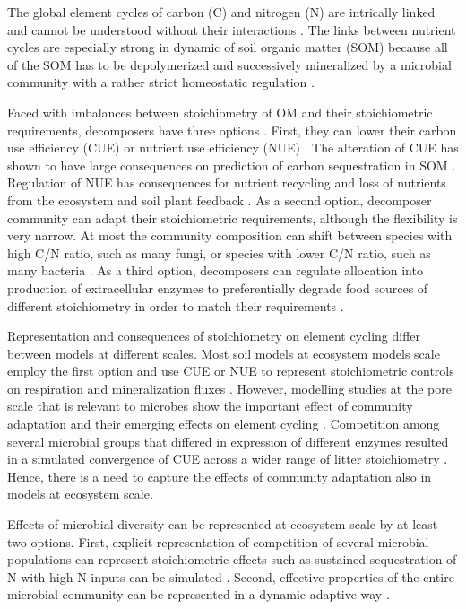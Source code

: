\introduction
The global element cycles of carbon (C) and nitrogen (N) are intrically linked
and cannot be understood without their interactions \citep{Thornton07,
Zaehle11}. The links between nutrient cycles are especially strong in dynamic of
soil organic matter (SOM) because all of the SOM has to be depolymerized and
successively mineralized by a microbial community with a rather strict
homeostatic regulation \citep{Sterner02, Zechmeister15}. 

Faced with imbalances between stoichiometry of OM and their stoichiometric
requirements, decomposers have three options \citep{Mooshammer14}. First,
they can lower their carbon use efficiency (CUE) or nutrient use efficiency
(NUE) \citep{Sinsabaugh13}. The alteration of CUE has shown to have large
consequences on prediction of carbon sequestration in SOM \citep{Allison14a, Wieder13}.
Regulation of NUE has consequences for nutrient recycling and loss of nutrients
from the ecosystem \citep{Mooshammer14a} and soil plant feedback
\citep{Rastetter11}. 
As a second option, decomposer community can adapt their stoichiometric
requirements, although the flexibility is very narrow. At most the community
composition can shift between species with high C/N ratio, such as many fungi,
or species with lower C/N ratio, such as many bacteria \citep{Cleveland07,
Xu13}.
As a third option, decomposers can regulate allocation into production of
extracellular enzymes to preferentially degrade food sources of different
stoichiometry in order to match their requirements \citep{Moorhead12}. 

Representation and consequences of stoichiometry on element cycling differ
between models at different scales. Most soil models at ecosystem models scale
employ the first option and use CUE or NUE to represent stoichiometric controls
on respiration and mineralization fluxes \citep{Manzoni08}. However, modelling
studies at the pore scale that is relevant to microbes show the important effect
of community adaptation and their emerging effects on element cycling
\citep{Allison05, Resat11, Wang13}. Competition among several
microbial groups that differed in expression of different enzymes resulted in a
simulated convergence of CUE across a wider range of litter stoichiometry
\citep{Kaiser14}. Hence, there is a need to capture the effects of community
adaptation also in models at ecosystem scale.

Effects of microbial diversity can be represented at ecosystem scale by
at least two options. First, explicit representation of competition of
several microbial populations can represent stoichiometric effects such as
sustained sequestration of N with high N inputs can be simulated \citep{Perveen14}.
Second, effective properties of the entire microbial community can be
represented in a dynamic adaptive way \citep{Rastetter97, Rastetter11}.

